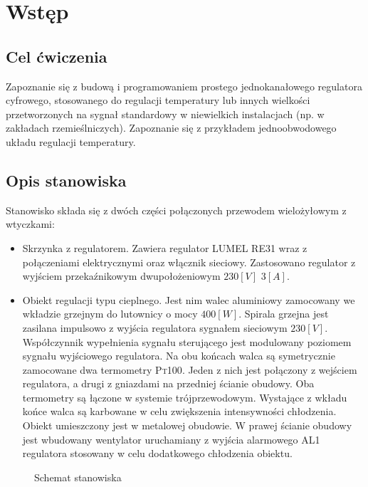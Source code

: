 \documentclass[12pt]{article}
\begin{document}


\section{Wstęp}

\subsection{Cel ćwiczenia}

Zapoznanie się z budową i programowaniem prostego jednokanałowego regulatora cyfrowego, 
stosowanego do regulacji temperatury lub innych wielkości przetworzonych na sygnał 
standardowy w niewielkich instalacjach (np. w zakładach rzemieślniczych). Zapoznanie się z 
przykładem jednoobwodowego układu regulacji temperatury.

\subsection{Opis stanowiska} 

Stanowisko składa się z dwóch części połączonych przewodem wielożyłowym z
wtyczkami:

\begin{itemize}
	\item Skrzynka z regulatorem. Zawiera regulator \textsc{LUMEL RE31} wraz z
  	połączeniami elektrycznymi oraz włącznik sieciowy. Zastosowano regulator z
  	wyjściem przekaźnikowym dwupołożeniowym $230[V]$ $3[A]$.
  	\item Obiekt regulacji typu cieplnego. Jest nim walec aluminiowy zamocowany we wkładzie 
	grzejnym do lutownicy o mocy $400[W]$. Spirala grzejna jest zasilana impulsowo
	z wyjścia regulatora sygnałem sieciowym $230[V]$. Współczynnik wypełnienia
	sygnału sterującego jest modulowany poziomem sygnału wyjściowego regulatora.
	Na obu końcach walca są symetrycznie zamocowane dwa termometry \textsc{Pt100}.
	Jeden z nich jest połączony z wejściem regulatora, a drugi z gniazdami na
	przedniej ścianie obudowy. Oba termometry są łączone w systemie
	trójprzewodowym. Wystające z wkładu końce walca są karbowane w celu
	zwiększenia intensywności chłodzenia.
	Obiekt umieszczony jest w metalowej obudowie. W prawej ścianie obudowy jest
	wbudowany wentylator uruchamiany z wyjścia alarmowego \textsc{AL1} regulatora
	stosowany w celu dodatkowego chłodzenia obiektu.
\end{itemize}

\begin{figure}[!htb]
	\begin{center}
		
	\end{center}
	\caption{Schemat stanowiska}
\end{figure}
\end{document}
